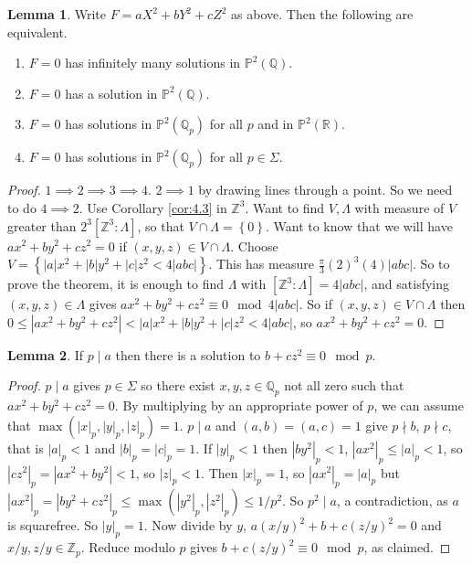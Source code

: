 \documentclass{article}
\newcommand{\Z}{\mathbb{Z}}
\newcommand{\Q}{\mathbb{Q}}
\newcommand{\R}{\mathbb{R}}
\renewcommand{\P}{\mathbb{P}}
\newcommand{\rb}[1]{\left( #1 \right)}
\renewcommand{\sb}[1]{\left[ #1 \right]}
\newcommand{\cb}[1]{\left\{ #1 \right\}}
\newcommand{\abs}[1]{\left\lvert #1 \right\rvert}
\theoremstyle{definition}\newtheorem{definition}{Definition}[section]
\theoremstyle{definition}\newtheorem{remark}[definition]{Remark}
\theoremstyle{definition}\newtheorem*{example}{Example}
\theoremstyle{definition}\newtheorem*{note}{Note}
\newtheorem{lemma}[definition]{Lemma}
\begin{document}
\begin{lemma}
Write $ F = aX^2 + bY^2 + cZ^2 $ as above. Then the following are equivalent.
\begin{enumerate}
\item $ F = 0 $ has infinitely many solutions in $ \P^2\rb{\Q} $.
\item $ F = 0 $ has a solution in $ \P^2\rb{\Q} $.
\item $ F = 0 $ has solutions in $ \P^2\rb{\Q_p} $ for all $ p $ and in $ \P^2\rb{\R} $.
\item $ F = 0 $ has solutions in $ \P^2\rb{\Q_p} $ for all $ p \in \Sigma $.
\end{enumerate}
\end{lemma}

\begin{proof}
$ 1 \implies 2 \implies 3 \implies 4 $. $ 2 \implies 1 $ by drawing lines through a point. So we need to do $ 4 \implies 2 $. Use Corollary \ref{cor:4.3} in $ \Z^3 $. Want to find $ V, \Lambda $ with measure of $ V $ greater than $ 2^3\sb{\Z^3 : \Lambda} $, so that $ V \cap \Lambda = \cb{0} $. Want to know that we will have $ ax^2 + by^2 + cz^2 = 0 $ if $ \rb{x, y, z} \in V \cap \Lambda $. Choose $ V = \cb{\abs{a}x^2 + \abs{b}y^2 + \abs{c}z^2 < 4\abs{abc}} $. This has measure $ \tfrac{\pi}{3}\rb{2}^3\rb{4}\abs{abc} $. So to prove the theorem, it is enough to find $ \Lambda $ with $ \sb{\Z^3 : \Lambda} = 4\abs{abc} $, and satisfying $ \rb{x, y, z} \in \Lambda $ gives $ ax^2 + by^2 + cz^2 \equiv 0 \mod 4\abs{abc} $. So if $ \rb{x, y, z} \in V \cap \Lambda $ then $ 0 \le \abs{ax^2 + by^2 + cz^2} < \abs{a}x^2 + \abs{b}y^2 + \abs{c}z^2 < 4\abs{abc} $, so $ ax^2 + by^2 + cz^2 = 0 $.
\end{proof}


\begin{lemma}
If $ p \mid a $ then there is a solution to $ b + cz^2 \equiv 0 \mod p $.
\end{lemma}

\begin{proof}
$ p \mid a $ gives $ p \in \Sigma $ so there exist $ x, y, z \in \Q_p $ not all zero such that $ ax^2 + by^2 + cz^2 = 0 $. By multiplying by an appropriate power of $ p $, we can assume that $ \max\rb{\abs{x}_p, \abs{y}_p, \abs{z}_p} = 1 $. $ p \mid a $ and $ \rb{a, b} = \rb{a, c} = 1 $ give $ p \nmid b $, $ p \nmid c $, that is $ \abs{a}_p < 1 $ and $ \abs{b}_p = \abs{c}_p = 1 $. If $ \abs{y}_p < 1 $ then $ \abs{by^2}_p < 1 $, $ \abs{ax^2}_p \le \abs{a}_p < 1 $, so $ \abs{cz^2}_p = \abs{ax^2 + by^2} < 1 $, so $ \abs{z}_p < 1 $. Then $ \abs{x}_p = 1 $, so $ \abs{ax^2}_p = \abs{a}_p $ but $ \abs{ax^2}_p = \abs{by^2 + cz^2}_p \le \max\rb{\abs{y^2}_p, \abs{z^2}_p} \le 1 / p^2 $. So $ p^2 \mid a $, a contradiction, as $ a $ is squarefree. So $ \abs{y}_p = 1 $. Now divide by $ y $, $ a\rb{x / y}^2 + b + c\rb{z / y}^2 = 0 $ and $ x / y, z / y \in \Z_p $. Reduce modulo $ p $ gives $ b + c\rb{z / y}^2 \equiv 0 \mod p $, as claimed.
\end{proof}
\end{document}
